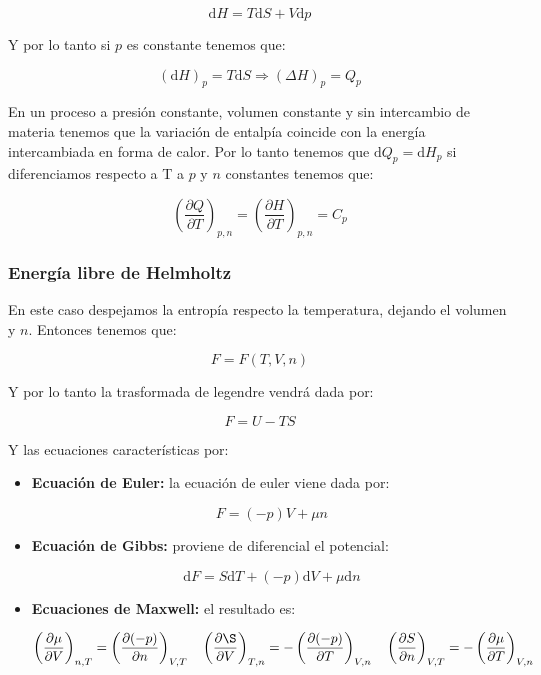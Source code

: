 \documentclass[12pt,a4paper]{article}
\newcommand{\D}{\mathrm{d}}
\newcommand{\parentesis}[1]{\left( #1 \right)}
\newcommand{\parciales}[2]{\frac{\partial #1}{\partial #2}}
\begin{document}
\begin{equation}
\D H = T \D S + V \D p
\end{equation}

Y por lo tanto si $p$ es constante tenemos que:

\begin{equation}
(\D H)_p = T\D S \Longrightarrow (\Delta H)_p = Q_p 
\end{equation}

En un proceso a presión constante, volumen constante y sin intercambio de materia tenemos que la variación de entalpía coincide con la energía intercambiada en forma de calor. Por lo tanto tenemos que $\D Q_p = \D H_p$ si diferenciamos respecto a T a $p$ y $n$ constantes tenemos que:

\begin{equation}
\parentesis{\parciales{Q}{T}}_{p, n} = \parentesis{\parciales{H}{T}}_{p, n} = C_p
\end{equation}

\subsubsection{Energía libre de Helmholtz}

En este caso despejamos la entropía respecto la temperatura, dejando el volumen y $n$. Entonces tenemos que:

\begin{equation}
F = F(T,V,n)
\end{equation}

Y por lo tanto la trasformada de legendre vendrá dada por:

\begin{equation}
F = U - TS
\end{equation}

Y las ecuaciones características por:

\begin{itemize}
\item \textbf{Ecuación de Euler:} la ecuación de euler viene dada por:

\begin{equation}
F = (-p) V + \mu n
\end{equation}

\item \textbf{Ecuación de Gibbs:} proviene de diferencial el potencial:

\begin{equation}
\D F = S \D T + (-p)\D V + \mu \D n
\end{equation}

\item \textbf{Ecuaciones de Maxwell:} el resultado es:

\begin{equation}
\parentesis{\parciales{\mu}{V}}_{n,T} = \parentesis{\parciales{(-p)}{n}}_{V,T} \quad \parentesis{\parciales{\S}{V}}_{T,n} = - \parentesis{\parciales{(-p)}{T}}_{V,n} \quad \parentesis{\parciales{S}{n}}_{V,T} = -\parentesis{\parciales{\mu}{T}}_{V,n}
\end{equation}

\end{itemize}
\end{document}
